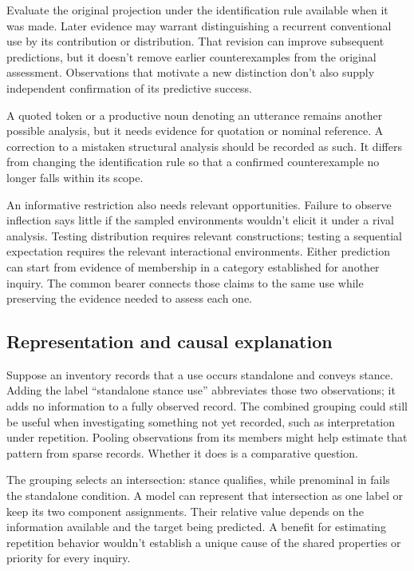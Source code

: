 \documentclass[12pt]{article}
\begin{document}
Evaluate the original projection under the identification rule available
when it was made. Later evidence may warrant distinguishing a recurrent
conventional use by its contribution or distribution. That revision
can improve subsequent predictions, but it doesn't remove earlier
counterexamples from the original assessment. Observations that motivate
a new distinction don't also supply independent confirmation of its
predictive success.

A quoted token or a productive noun denoting an utterance remains
another possible analysis, but it needs evidence for quotation or
nominal reference. A correction to a mistaken structural analysis should
be recorded as such. It differs from changing the identification rule
so that a confirmed counterexample no longer falls within its scope.

An informative restriction also needs relevant opportunities. Failure
to observe inflection says little if the sampled environments wouldn't
elicit it under a rival analysis. Testing distribution requires relevant
constructions; testing a sequential expectation requires the relevant
interactional environments. Either prediction can start from evidence
of membership in a category established for another inquiry. The common
bearer connects those claims to the same use while preserving the
evidence needed to assess each one.

\subsection{Representation and causal explanation}

Suppose an inventory records that a use occurs standalone and conveys
stance. Adding the label \enquote{standalone stance use} abbreviates
those two observations; it adds no information to a fully observed
record. The combined grouping could still be useful when investigating
something not yet recorded, such as interpretation under repetition.
Pooling observations from its members might help estimate that pattern
from sparse records. Whether it does is a comparative question.

The grouping selects an intersection: stance  qualifies,
while prenominal  in  fails the
standalone condition. A model can represent that intersection as one
label or keep its two component assignments. Their relative value
depends on the information available and the target being predicted.
A benefit for estimating repetition behavior wouldn't establish a
unique cause of the shared properties or priority for every inquiry.
\end{document}
